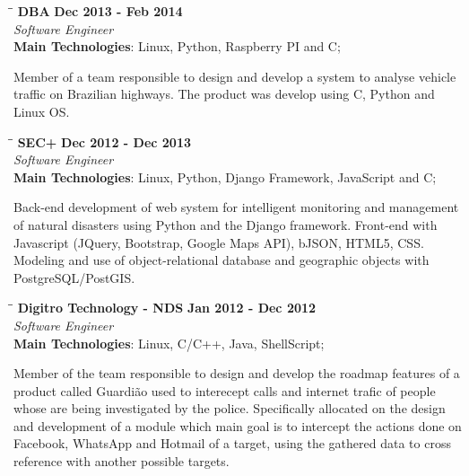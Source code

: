 \documentclass[margin]{res}
\begin{document}
\begin{resume}
\vspace{-0.1in}
   \begin{tabbing}
   \hspace{2.3in}\= \hspace{1.7in}\= \kill %
    \textbf{DBA}    \>\>\textbf{Dec 2013 - Feb 2014}\\
    \textit{Software Engineer}\\        
    \textbf{Main Technologies}: Linux, Python, Raspberry PI and C;
   \end{tabbing}\vspace{-20pt}      %
    \vspace{2mm}
        Member of a team responsible to design and develop a system to analyse vehicle traffic on Brazilian highways. The product was develop using C, Python and Linux OS.

\vspace{-0.1in}
   \begin{tabbing}
   \hspace{2.3in}\= \hspace{1.7in}\= \kill %
    \textbf{SEC+}    \>\>\textbf{Dec 2012 - Dec 2013}\\
    \textit{Software Engineer}\\        
    \textbf{Main Technologies}: Linux, Python, Django Framework, JavaScript and C;
   \end{tabbing}\vspace{-20pt}      %
    \vspace{2mm}
     Back-end development of web system for intelligent monitoring and management of natural disasters using Python and the Django framework. Front-end with Javascript (JQuery, Bootstrap, Google Maps API), bJSON, HTML5, CSS. Modeling and use of object-relational database and geographic objects with PostgreSQL/PostGIS.

\vspace{-0.1in}
   \begin{tabbing}
   \hspace{2.3in}\= \hspace{1.7in}\= \kill %
    \textbf{Digitro Technology - NDS}    \>\>\textbf{Jan 2012 - Dec 2012}\\
    \textit{Software Engineer}\\   
    \textbf{Main Technologies}: Linux, C/C++, Java, ShellScript;
   \end{tabbing}\vspace{-20pt}      %
    \vspace{2mm}
    Member of the team responsible to design and develop the roadmap features of a product called
    Guardião used to interecept calls and internet trafic of people whose are being investigated by the police. Specifically allocated on the design and development of a module which main goal is to intercept the actions done on Facebook, WhatsApp and Hotmail of a target, using the gathered data to cross reference with another possible targets.


\end{resume}
\end{document}
